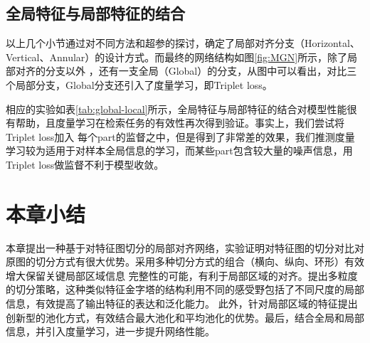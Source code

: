 \subsection{全局特征与局部特征的结合}
以上几个小节通过对不同方法和超参的探讨，确定了局部对齐分支（Horizontal、Vertical、Annular）的设计方式。而最终的网络结构如图\ref{fig:MGN}所示，除了局部对齐的分支以外
，还有一支全局（Global）的分支，从图中可以看出，对比三个局部分支，Global分支还引入了度量学习，即Triplet loss。


相应的实验如表\ref{tab:global-local}所示，全局特征与局部特征的结合对模型性能很有帮助，且度量学习在检索任务的有效性再次得到验证。事实上，我们尝试将Triplet loss加入
每个part的监督之中，但是得到了非常差的效果，我们推测度量学习较为适用于对样本全局信息的学习，而某些part包含较大量的噪声信息，用Triplet loss做监督不利于模型收敛。

\section{本章小结}
本章提出一种基于对特征图切分的局部对齐网络，实验证明对特征图的切分对比对原图的切分方式有很大优势。采用多种切分方式的组合（横向、纵向、环形）有效增大保留关键局部区域信息
完整性的可能，有利于局部区域的对齐。提出多粒度的切分策略，这种类似特征金字塔的结构利用不同的感受野包括了不同尺度的局部信息，有效提高了输出特征的表达和泛化能力。
此外，针对局部区域的特征提出创新型的池化方式，有效结合最大池化和平均池化的优势。最后，结合全局和局部信息，并引入度量学习，进一步提升网络性能。
